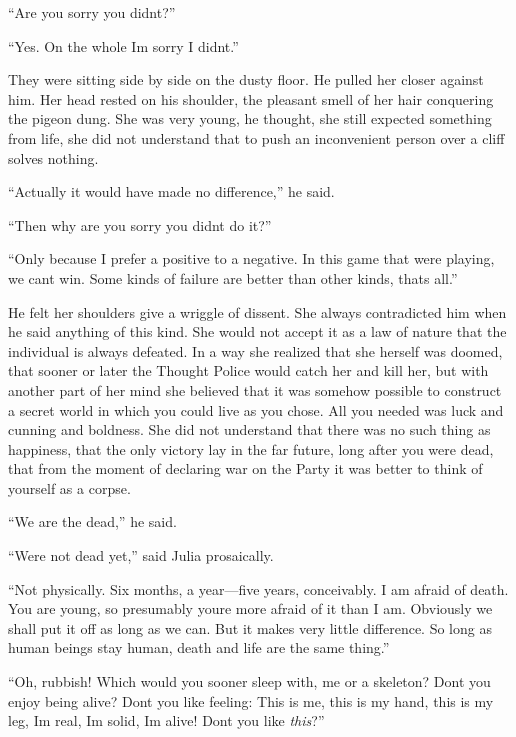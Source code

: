 ``Are you sorry you didn\textquotesingle t?''

``Yes. On the whole I\textquotesingle m sorry I didn\textquotesingle t.''

They were sitting side by side on the dusty floor. He pulled her closer
against him. Her head rested on his shoulder, the pleasant smell of her
hair conquering the pigeon dung. She was very young, he thought, she
still expected something from life, she did not understand that to push
an inconvenient person over a cliff solves nothing.

``Actually it would have made no difference,'' he said.

``Then why are you sorry you didn\textquotesingle t do it?''

``Only because I prefer a positive to a negative. In this game that
we\textquotesingle re playing, we can\textquotesingle t win. Some kinds
of failure are better than other kinds, that\textquotesingle s all.''

He felt her shoulders give a wriggle of dissent. She always contradicted
him when he said anything of this kind. She would not accept it as a law
of nature that the individual is always defeated. In a way she realized
that she herself was doomed, that sooner or later the Thought Police
would catch her and kill her, but with another part of her mind she
believed that it was somehow possible to construct a secret world in
which you could live as you chose. All you needed was luck and cunning
and boldness. She did not understand that there was no such thing as
happiness, that the only victory lay in the far future, long after you
were dead, that from the moment of declaring war on the Party it was
better to think of yourself as a corpse.

``We are the dead,'' he said.

``We\textquotesingle re not dead yet,'' said Julia prosaically.

``Not physically. Six months, a year---five years, conceivably. I am
afraid of death. You are young, so presumably you\textquotesingle re
more afraid of it than I am. Obviously we shall put it off as long as we
can. But it makes very little difference. So long as human beings stay
human, death and life are the same thing.''

``Oh, rubbish! Which would you sooner sleep with, me or a skeleton?
Don\textquotesingle t you enjoy being alive? Don\textquotesingle t you
like feeling: This is me, this is my hand, this is my leg,
I\textquotesingle m real, I\textquotesingle m solid, I\textquotesingle m
alive! Don\textquotesingle t you like \emph{this}?''

